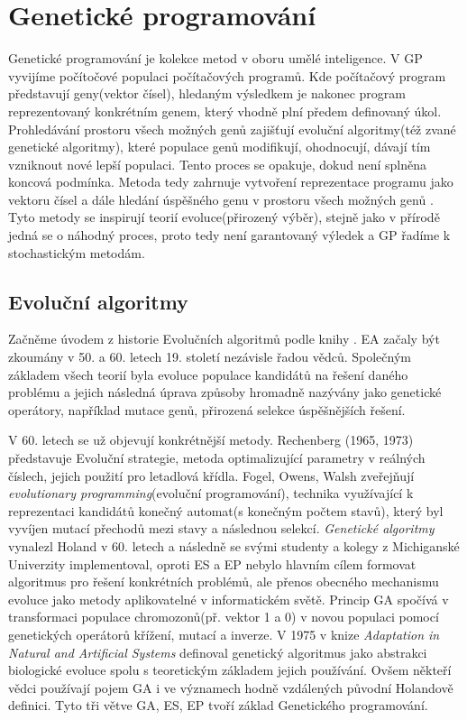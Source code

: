 \chapter{Genetické programování}
Genetické programování je kolekce metod v oboru umělé inteligence. V  GP vyvijíme počítočové populaci počítačových programů. Kde počítačový program představují geny(vektor čísel), hledaným výsledkem je nakonec program reprezentovaný konkrétním genem, který vhodně plní předem definovaný úkol. Prohledávání prostoru všech možných genů zajišťují evoluční algoritmy(též zvané genetické algoritmy), které populace genů modifikují, ohodnocují, dávají tím vzniknout nové lepší populaci. Tento proces se opakuje, dokud není splněna koncová podmínka. Metoda tedy zahrnuje vytvoření reprezentace programu jako vektoru čísel a dále hledání úspěšného genu v prostoru všech možných genů \citep{field}. Tyto metody se inspirují teorií evoluce(přirozený výběr), stejně jako v přírodě jedná se o náhodný proces, proto tedy není garantovaný výledek a GP řadíme k stochastickým metodám. 
\section{Evoluční algoritmy}
Začněme úvodem z historie Evolučních algoritmů podle knihy \citep{MitchellBook}. EA začaly být zkoumány v 50. a 60. letech 19. století nezávisle řadou vědců. Společným základem všech teorií byla evoluce populace kandidátů na řešení daného problému a jejich následná úprava způsoby hromadně nazývány jako genetické operátory, například mutace genů, přirozená selekce úspěšnějších řešení. \par 
V 60. letech se už objevují konkrétnější metody. Rechenberg (1965, 1973) představuje Evoluční strategie, metoda optimalizující parametry v reálných číslech, jejich použití pro letadlová křídla. Fogel, Owens, Walsh zveřejňují \textit{evolutionary programming}(evoluční programování), technika využívající k reprezentaci kandidátů konečný automat(s konečným počtem stavů), který byl vyvíjen mutací přechodů mezi stavy a následnou selekcí. \textit{Genetické algoritmy} vynalezl Holand v 60. letech a následně se svými studenty a kolegy z Michiganské Univerzity implementoval, oproti ES a EP nebylo hlavním cílem formovat algoritmus pro řešení konkrétních problémů, ale přenos obecného mechanismu evoluce jako metody aplikovatelné v informatickém světě. Princip GA spočívá v transformaci populace chromozonů(př. vektor 1 a 0) v novou populaci pomocí genetických operátorů křížení, mutací a inverze. V 1975 v knize \textit{Adaptation in Natural and  Artificial Systems} \citep{HolandBook} definoval genetický algoritmus jako abstrakci biologické evoluce spolu s teoretickým základem jejich používání. Ovšem někteří vědci používají pojem GA i ve významech hodně vzdálených původní Holandově definici. Tyto tři větve GA, ES, EP tvoří základ Genetického programování. 
